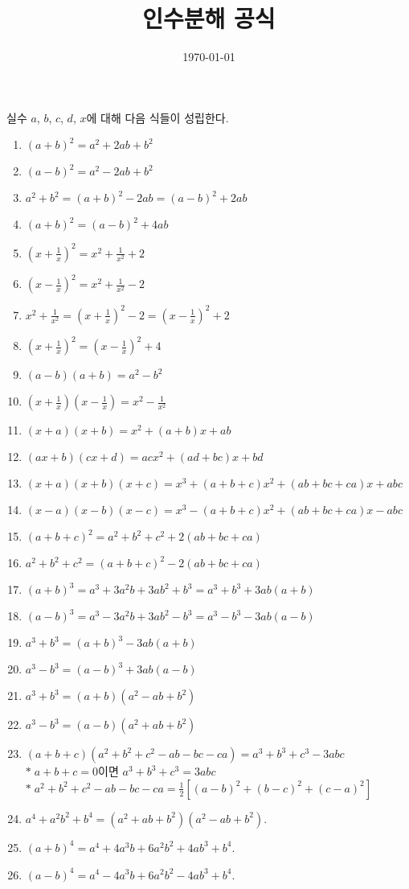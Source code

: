 \documentclass{article}
\begin{document}
\title{인수분해 공식}
\author{}
\date{\today}
\maketitle


%
실수 \(a\), \(b\), \(c\), \(d\), \(x\)에 대해 다음 식들이 성립한다.
\begin{enumerate}[(1)]
\item
\((a+b)^2=a^2+2ab+b^2\)
\item
\((a-b)^2=a^2-2ab+b^2\)
\item
\(a^2+b^2=(a+b)^2-2ab=(a-b)^2+2ab\)
\item
\((a+b)^2=(a-b)^2+4ab\)
\item
\((x+\frac1x)^2=x^2+\frac1{x^2}+2\)
\item
\((x-\frac1x)^2=x^2+\frac1{x^2}-2\)
\item
\(x^2+\frac1{x^2}=(x+\frac1x)^2-2=(x-\frac1x)^2+2\)
\item
\((x+\frac1x)^2=(x-\frac1x)^2+4\)
\item
\((a-b)(a+b)=a^2-b^2\)
\item
\((x+\frac1x)(x-\frac1x)=x^2-\frac1{x^2}\)
\item
\((x+a)(x+b)=x^2+(a+b)x+ab\)
\item
\((ax+b)(cx+d)=acx^2+(ad+bc)x+bd\)
\item
\((x+a)(x+b)(x+c)=x^3+(a+b+c)x^2+(ab+bc+ca)x+abc\)
\item
\((x-a)(x-b)(x-c)=x^3-(a+b+c)x^2+(ab+bc+ca)x-abc\)
\item
\((a+b+c)^2=a^2+b^2+c^2+2(ab+bc+ca)\)
\item
\(a^2+b^2+c^2=(a+b+c)^2-2(ab+bc+ca)\)
\item
\((a+b)^3=a^3+3a^2b+3ab^2+b^3=a^3+b^3+3ab(a+b)\)
\item
\((a-b)^3=a^3-3a^2b+3ab^2-b^3=a^3-b^3-3ab(a-b)\)
\item
\(a^3+b^3=(a+b)^3-3ab(a+b)\)
\item
\(a^3-b^3=(a-b)^3+3ab(a-b)\)
\item
\(a^3+b^3=(a+b)(a^2-ab+b^2)\)
\item
\(a^3-b^3=(a-b)(a^2+ab+b^2)\)
\item
\((a+b+c)(a^2+b^2+c^2-ab-bc-ca)=a^3+b^3+c^3-3abc\)\\
\(*\;a+b+c=0\)이면 \(a^3+b^3+c^3=3abc\)\\
\(*\;a^2+b^2+c^2-ab-bc-ca=\frac12[(a-b)^2+(b-c)^2+(c-a)^2]\)
\item
\(a^4+a^2b^2+b^4=(a^2+ab+b^2)(a^2-ab+b^2)\).
\item
\((a+b)^4=a^4+4a^3b+6a^2b^2+4ab^3+b^4\).
\item
\((a-b)^4=a^4-4a^3b+6a^2b^2-4ab^3+b^4\).
\end{enumerate}
\end{document}
